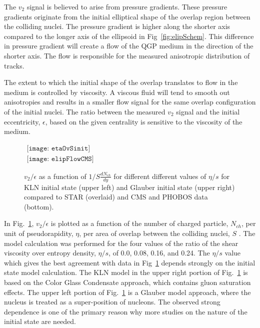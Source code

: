     The $v_{2}$ signal is believed to arise from pressure gradients.
    These pressure gradients originate from the initial elliptical shape of 
      the overlap region between the colliding nuclei. 
    The pressure gradient is higher along the shorter axis compared to 
      the longer axis of the ellipsoid in Fig~\ref{fig:elipSchem}.
    This difference in pressure gradient will create a flow of the QGP 
      medium in the direction of the shorter axis. 
    The flow is responsible for the measured anisotropic distribution of 
      tracks. 

    The extent to which the initial shape of the overlap translates to flow
      in the medium is controlled by viscosity. 
    A viscous fluid will tend to smooth out anisotropies and results in 
      a smaller flow signal for the same overlap configuration of the initial
      nuclei. 
    The ratio between the measured $v_{2}$ signal and the initial 
      eccentricity, $\epsilon$, based on the given centrality is sensitive
      to the viscosity of the medium. 

    \begin{figure}[!Hhbt]
      \centering
      $ \begin{array}{cc}
        \texttt{[image: etaOvSinit]} \\
        \texttt{[image: elipFlowCMS]}
      \end{array} $
      \caption{$v_{2}/\epsilon$  as a function of $1/S \frac{dN_{ch}}{dy}$
        for different different values of $\eta/s$ for KLN initial state 
        (upper left) and Glauber initial state (upper right) compared to STAR (overlaid)
        and CMS and PHOBOS data (bottom).}
      \label{fig:elipFlow}
    \end{figure}

    In Fig.~\ref{fig:elipFlow}, $v_{2}/\epsilon$ is plotted as a function of 
      the number of charged particle, $N_{ch}$, per unit of pseudorapidity, 
      $\eta$, per area of overlap between the colliding nuclei, 
      $S$ \cite{etaOvSinit}. 
    The model calculation was performed for the four values of the ratio of the 
      shear viscosity over entropy density, $\eta/s$, of 
      0.0, 0.08, 0.16, and 0.24.
    The $\eta/s$ value which gives the best agreement with data in 
      Fig~\ref{fig:elipFlow} depends strongly on the initial state model 
      calculation.
    The KLN model in the upper right portion of Fig.~\ref{fig:elipFlow} is based on
      the Color Glass Condensate approach, which contains gluon saturation 
      effects. 
    The upper left portion of Fig.~\ref{fig:elipFlow} is a Glauber model 
      approach, where the nucleus is treated as a super-position of nucleons.
    The observed strong dependence is one of the primary reason
      why more studies on the nature of the initial state are needed.


